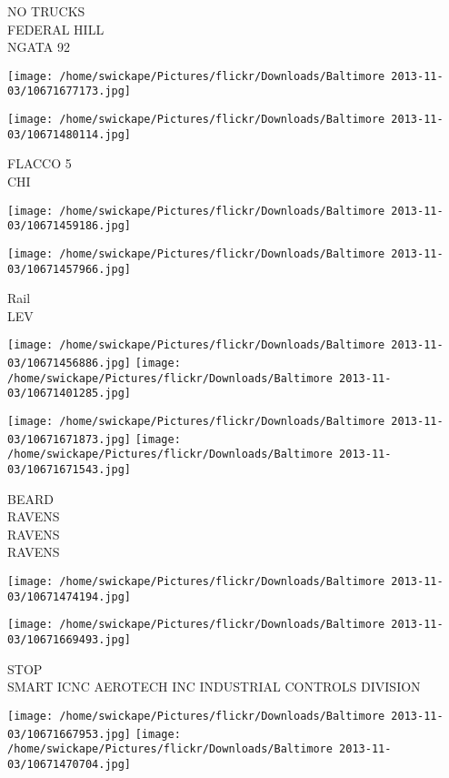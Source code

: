\documentclass[10pt,letterpaper]{article}
\begin{document}
NO TRUCKS\\
FEDERAL HILL\\
NGATA 92\\
\pagebreak

\texttt{[image: /home/swickape/Pictures/flickr/Downloads/Baltimore 2013-11-03/10671677173.jpg]}

\vspace{0.25in}
\texttt{[image: /home/swickape/Pictures/flickr/Downloads/Baltimore 2013-11-03/10671480114.jpg]}

FLACCO 5\\
CHI\\
\pagebreak

\texttt{[image: /home/swickape/Pictures/flickr/Downloads/Baltimore 2013-11-03/10671459186.jpg]}

\vspace{0.25in}
\texttt{[image: /home/swickape/Pictures/flickr/Downloads/Baltimore 2013-11-03/10671457966.jpg]}

Rail\\
LEV\\
\pagebreak

\texttt{[image: /home/swickape/Pictures/flickr/Downloads/Baltimore 2013-11-03/10671456886.jpg]}
\texttt{[image: /home/swickape/Pictures/flickr/Downloads/Baltimore 2013-11-03/10671401285.jpg]}

\texttt{[image: /home/swickape/Pictures/flickr/Downloads/Baltimore 2013-11-03/10671671873.jpg]}
\texttt{[image: /home/swickape/Pictures/flickr/Downloads/Baltimore 2013-11-03/10671671543.jpg]}

BEARD\\
RAVENS\\
RAVENS\\
RAVENS\\
\pagebreak

\texttt{[image: /home/swickape/Pictures/flickr/Downloads/Baltimore 2013-11-03/10671474194.jpg]}

\vspace{0.25in}
\texttt{[image: /home/swickape/Pictures/flickr/Downloads/Baltimore 2013-11-03/10671669493.jpg]}

STOP\\
SMART ICNC AEROTECH INC INDUSTRIAL CONTROLS DIVISION\\
\pagebreak

\texttt{[image: /home/swickape/Pictures/flickr/Downloads/Baltimore 2013-11-03/10671667953.jpg]}
\texttt{[image: /home/swickape/Pictures/flickr/Downloads/Baltimore 2013-11-03/10671470704.jpg]}
\end{document}
